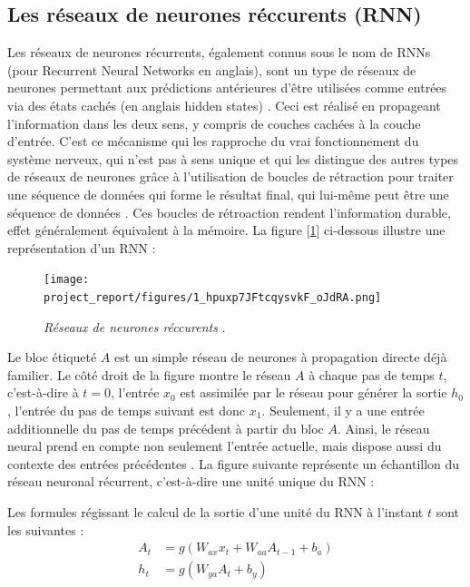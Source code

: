 \subsection{Les réseaux de neurones réccurents (RNN)}
Les réseaux de neurones récurrents, également connus sous le nom de RNNs (pour Recurrent Neural Networks en anglais), sont un type de réseaux de neurones permettant aux prédictions antérieures d’être utilisées comme entrées via des états cachés (en anglais hidden states) \cite{wikiRNN}. Ceci est réalisé en propageant l’information dans les deux sens, y compris de couches cachées à la couche d’entrée. C’est ce mécanisme qui les rapproche du vrai fonctionnement du système nerveux, qui n’est pas à sens unique et qui les distingue des autres types de réseaux de neurones grâce à l’utilisation de boucles de rétraction pour traiter une séquence de données qui forme le résultat final, qui lui-même peut être une séquence de données \cite{wikiRNN}. Ces boucles de rétroaction rendent l’information durable, effet généralement équivalent à la mémoire. La figure [\ref{fig:figure1}] ci-dessous illustre une représentation d’un RNN :
\begin{figure}[h]
    \centering
    \texttt{[image: project\_report/figures/1\_hpuxp7JFtcqysvkF\_oJdRA.png]} 
    \caption{\textit{Réseaux de neurones réccurents } \cite{choudhry2024}.}
        \label{fig:figure1}
 
\end{figure}

Le bloc étiqueté $A$ est un simple réseau de neurones à propagation directe déjà familier. Le côté droit de la figure montre le réseau $A$ à chaque pas de temps $t$, c’est-à-dire à $t = 0$, l’entrée $x_0$ est assimilée par le réseau pour générer la sortie $h_0$, l’entrée du pas de temps suivant est donc $x_1$. Seulement, il y a une entrée additionnelle du pas de temps précédent à partir du bloc $A$. Ainsi, le réseau neural prend en compte non seulement l’entrée actuelle, mais dispose aussi du contexte des entrées précédentes \cite{wikiRNN}. La figure suivante représente un échantillon du réseau neuronal récurrent, c’est-à-dire une unité unique du RNN :


Les formules régissant le calcul de la sortie d’une unité du RNN à l’instant \( t \) sont les suivantes \cite{wikiRNN}:
\begin{align}
A_t &= g(W_{ax} x_t + W_{aa} A_{t-1} + b_a) \\
h_t &= g(W_{ya} A_t + b_y)
\end{align}

